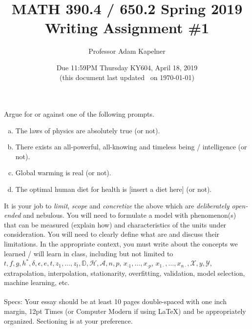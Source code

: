 \documentclass[12pt]{article}
\title{MATH 390.4 / 650.2 Spring 2019 \\ Writing Assignment \#1}
\author{Professor Adam Kapelner} %
\date{Due 11:59PM Thursday KY604, April 18, 2019 \\ \vspace{0.5cm} \small (this document last updated \currenttime~on \today)}
\begin{document}
\maketitle

\noindent Argue for or against one of the following prompts. 

\begin{enumerate}[(a)]
\item The laws of physics are absolutely true (or not).
\item There exists an all-powerful, all-knowing and timeless being / intelligence (or not).
\item Global warming is real (or not).
\item The optimal human diet for health is [insert a diet here] (or not).
\end{enumerate}

\noindent It is your job to \textit{limit}, \textit{scope} and \textit{concretize} the above which are \textit{deliberately open-ended} and nebulous. You will need to formulate a model with phenomenon(s) that can be measured (explain how) and characteristics of the units under consideration. You will need to clearly define what  are and discuss their limitations. In the appropriate context, you must write about the concepts we learned / will learn in class, including but not limited to $t ,f, g, h^*, \delta, \epsilon, e, t, z_1, \ldots, z_t, \mathbb{D}, \mathcal{H}, \mathcal{A}, n, p$, $x_{\cdot 1}, \ldots, x_{\cdot p}$, $x_{1 \cdot}, \ldots, x_{n \cdot}, \mathcal{X}, y, \mathcal{Y}$, extrapolation, interpolation, stationarity, overfitting, validation, model selection, machine learning, etc. \\
~\\
Specs: Your essay should be at least 10 pages double-spaced with one inch margin, 12pt Times (or Computer Modern if using \LaTeX) and be appropriately organized. Sectioning is at your preference.

\end{document}
